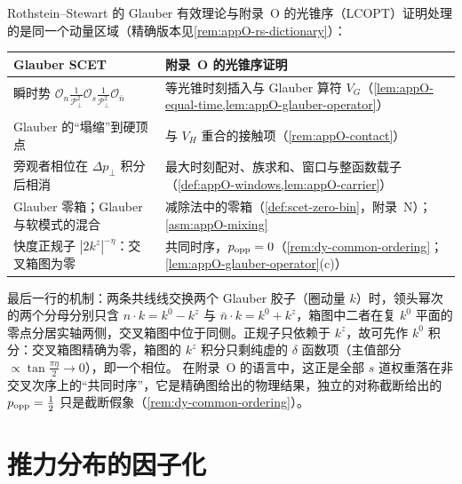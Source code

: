\begin{remark}\label{rem:scet-glauber-dictionary}
Rothstein--Stewart 的 Glauber 有效理论与附录~O 的光锥序（LCOPT）证明处理的是同一个动量区域（精确版本见\cref{rem:appO-rs-dictionary}）：
\begin{center}\small
\renewcommand{\arraystretch}{1.1}
\begin{tabular}{@{}p{}p{}@{}}
\toprule
Glauber SCET\cite{RothsteinStewart2016} & 附录~O 的光锥序证明 \\
\midrule
瞬时势 $\mathcal O_n\frac{1}{\mathcal P_\perp^2}\mathcal O_s\frac{1}{\mathcal P_\perp^2}\mathcal O_{\bar n}$ & 等光锥时刻插入与 Glauber 算符 $V_G$（\cref{lem:appO-equal-time,lem:appO-glauber-operator}） \\
Glauber 的“塌缩”到硬顶点 & 与 $V_H$ 重合的接触项（\cref{rem:appO-contact}） \\
旁观者相位在 $\Delta p_\perp$ 积分后相消 & 最大时刻配对、族求和、窗口与整函数载子（\cref{def:appO-windows,lem:appO-carrier}） \\
Glauber 零箱；Glauber 与软模式的混合 & 减除法中的零箱（\cref{def:scet-zero-bin}，附录~N）；\cref{asm:appO-mixing} \\
快度正规子 $|2k^z|^{-\eta}$：交叉箱图为零 & 共同时序，$p_{\rm opp}=0$（\cref{rem:dy-common-ordering}；\cref{lem:appO-glauber-operator}(c)） \\
\bottomrule
\end{tabular}
\end{center}
最后一行的机制：两条共线线交换两个 Glauber 胶子（圈动量 $k$）时，领头幂次的两个分母分别只含 $n\cdot k=k^0-k^z$ 与 $\bar n\cdot k=k^0+k^z$，箱图中二者在复 $k^0$ 平面的零点分居实轴两侧，交叉箱图中位于同侧。正规子只依赖于 $k^z$，故可先作 $k^0$ 积分：交叉箱图精确为零，箱图的 $k^z$ 积分只剩纯虚的 $\delta$ 函数项（主值部分 $\propto\tan\frac{\pi\eta}{2}\to0$），即一个相位\cite[第~5.2~节]{RothsteinStewart2016}。%
在附录~O 的语言中，这正是全部 $s$ 道权重落在非交叉次序上的“共同时序”，它是精确图给出的物理结果，独立的对称截断给出的 $p_{\rm opp}=\frac12$ 只是截断假象（\cref{rem:dy-common-ordering}）。
\end{remark}

\section{推力分布的因子化}\label{sec:scet-thrust}


